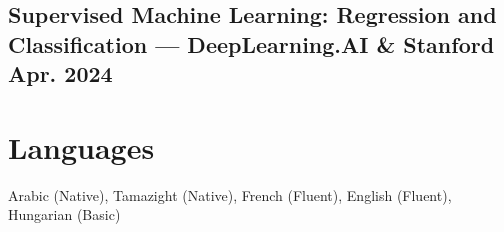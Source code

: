 \documentclass[10pt]{article}
\begin{document}
\subsection{Supervised Machine Learning: Regression and Classification \mdseries --- DeepLearning.AI \& Stanford \href{https://www.coursera.org/account/accomplishments/verify/UK73ZU6SNA29}{} \hfill Apr. 2024}

\section{Languages}

\noindent Arabic (Native), Tamazight (Native), French (Fluent), English (Fluent), Hungarian (Basic)
\end{document}
